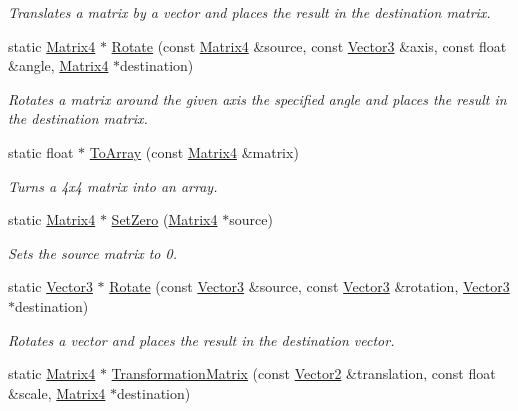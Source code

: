 \begin{DoxyCompactItemize}
\begin{DoxyCompactList}\small\item\em Translates a matrix by a vector and places the result in the destination matrix. \end{DoxyCompactList}\item 
static \hyperlink{class_flounder_1_1_matrix4}{Matrix4} $\ast$ \hyperlink{class_flounder_1_1_matrix4_aa2b17e0206e188281dde17716cdcd3bf}{Rotate} (const \hyperlink{class_flounder_1_1_matrix4}{Matrix4} \&source, const \hyperlink{class_flounder_1_1_vector3}{Vector3} \&axis, const float \&angle, \hyperlink{class_flounder_1_1_matrix4}{Matrix4} $\ast$destination)
\begin{DoxyCompactList}\small\item\em Rotates a matrix around the given axis the specified angle and places the result in the destination matrix. \end{DoxyCompactList}\item 
static float $\ast$ \hyperlink{class_flounder_1_1_matrix4_a903ee082970ca9b9b6735a4760b30876}{To\+Array} (const \hyperlink{class_flounder_1_1_matrix4}{Matrix4} \&matrix)
\begin{DoxyCompactList}\small\item\em Turns a 4x4 matrix into an array. \end{DoxyCompactList}\item 
static \hyperlink{class_flounder_1_1_matrix4}{Matrix4} $\ast$ \hyperlink{class_flounder_1_1_matrix4_a5073e506428978d8e7d9c2ee0315a895}{Set\+Zero} (\hyperlink{class_flounder_1_1_matrix4}{Matrix4} $\ast$source)
\begin{DoxyCompactList}\small\item\em Sets the source matrix to 0. \end{DoxyCompactList}\item 
static \hyperlink{class_flounder_1_1_vector3}{Vector3} $\ast$ \hyperlink{class_flounder_1_1_matrix4_a8ad82eb51cc122416bbdf06e163827d2}{Rotate} (const \hyperlink{class_flounder_1_1_vector3}{Vector3} \&source, const \hyperlink{class_flounder_1_1_vector3}{Vector3} \&rotation, \hyperlink{class_flounder_1_1_vector3}{Vector3} $\ast$destination)
\begin{DoxyCompactList}\small\item\em Rotates a vector and places the result in the destination vector. \end{DoxyCompactList}\item 
static \hyperlink{class_flounder_1_1_matrix4}{Matrix4} $\ast$ \hyperlink{class_flounder_1_1_matrix4_a50b2261230e6c53d7049c890ca92961a}{Transformation\+Matrix} (const \hyperlink{class_flounder_1_1_vector2}{Vector2} \&translation, const float \&scale, \hyperlink{class_flounder_1_1_matrix4}{Matrix4} $\ast$destination)

\end{DoxyCompactItemize}
